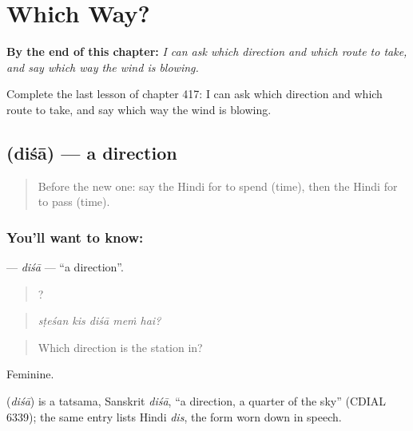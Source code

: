 
\chapter{Which Way?}
\label{ch:hi-which-way}

\begin{chapteropening}
\textbf{By the end of this chapter:} \emph{I can ask which direction and which route to take, and say which way the wind is blowing.}

Complete the last lesson of chapter 417: I can ask which direction and which route to take, and say which way the wind is blowing.
\end{chapteropening}

\section[\texorpdfstring{\hi{दिशा} (diśā)}{दिशा (diśā)}]{ (diśā) — a direction}

\label{lesson:HI-C417-disa}



\begin{quote}
Before the new one: say the Hindi for to spend (time), then the Hindi for to pass (time).
\end{quote}

\subsection*{You'll want to know: }
\textbf{} — \emph{diśā} — \textquotedblleft{}a direction\textquotedblright{}.

\begin{quote}
    ?
\end{quote}

\begin{quote}
\emph{sṭeśan kis diśā meṁ hai?}
\end{quote}

\begin{quote}
Which direction is the station in?
\end{quote}

Feminine.

\begin{cousinweb}
\textbf{} (\emph{diśā}) is a tatsama, Sanskrit \emph{diśā}, \textquotedblleft{}a direction, a quarter of the sky\textquotedblright{} (CDIAL 6339); the same entry lists Hindi \emph{dis}, the form worn down in speech.
\end{cousinweb}

